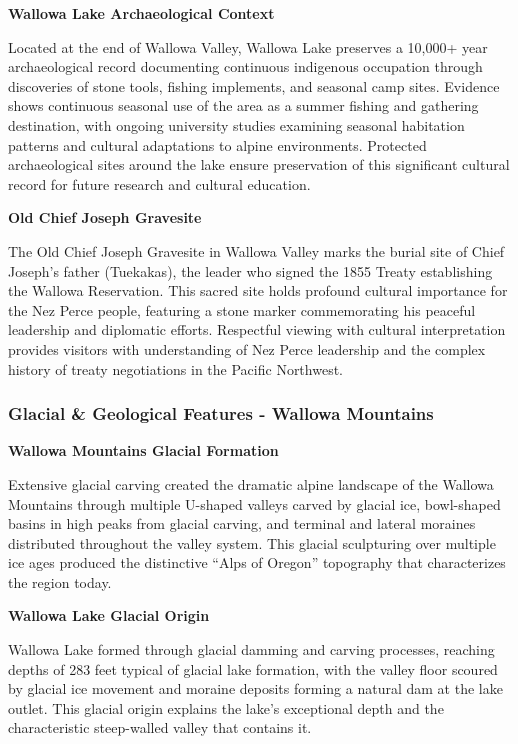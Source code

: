 \documentclass[
  11pt,
  letterpaper,
  DIV=10,
  numbers=noendperiod]{scrartcl}
\begin{document}
\textbf{Wallowa Lake Archaeological Context}

Located at the end of Wallowa Valley, Wallowa Lake preserves a 10,000+
year archaeological record documenting continuous indigenous occupation
through discoveries of stone tools, fishing implements, and seasonal
camp sites. Evidence shows continuous seasonal use of the area as a
summer fishing and gathering destination, with ongoing university
studies examining seasonal habitation patterns and cultural adaptations
to alpine environments. Protected archaeological sites around the lake
ensure preservation of this significant cultural record for future
research and cultural education.

\textbf{Old Chief Joseph Gravesite}

The Old Chief Joseph Gravesite in Wallowa Valley marks the burial site
of Chief Joseph's father (Tuekakas), the leader who signed the 1855
Treaty establishing the Wallowa Reservation. This sacred site holds
profound cultural importance for the Nez Perce people, featuring a stone
marker commemorating his peaceful leadership and diplomatic efforts.
Respectful viewing with cultural interpretation provides visitors with
understanding of Nez Perce leadership and the complex history of treaty
negotiations in the Pacific Northwest.

\subsubsection{Glacial \& Geological Features - Wallowa
Mountains}\label{glacial-geological-features---wallowa-mountains}

\textbf{Wallowa Mountains Glacial Formation}

Extensive glacial carving created the dramatic alpine landscape of the
Wallowa Mountains through multiple U-shaped valleys carved by glacial
ice, bowl-shaped basins in high peaks from glacial carving, and terminal
and lateral moraines distributed throughout the valley system. This
glacial sculpturing over multiple ice ages produced the distinctive
``Alps of Oregon'' topography that characterizes the region today.

\textbf{Wallowa Lake Glacial Origin}

Wallowa Lake formed through glacial damming and carving processes,
reaching depths of 283 feet typical of glacial lake formation, with the
valley floor scoured by glacial ice movement and moraine deposits
forming a natural dam at the lake outlet. This glacial origin explains
the lake's exceptional depth and the characteristic steep-walled valley
that contains it.
\end{document}
